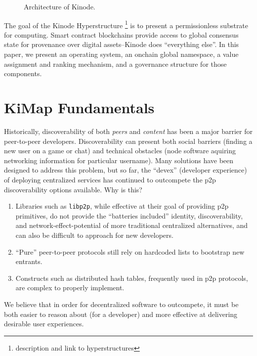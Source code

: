 \documentclass[runningheads]{llncs}
\begin{document}
\begin{figure}[H]
    \centering
    \caption{Architecture of Kinode.}
    \label{fig:triangle}
\end{figure}

The goal of the Kinode Hyperstructure
\footnote{description and link to hyperstructures}
is to present a permissionless substrate for computing.
Smart contract blockchains provide access to global consensus state for provenance over digital assets–Kinode does ``everything else''.
In this paper, we present an operating system, an onchain global namespace, a value assignment and ranking mechanism, and a governance structure for those components.

\section{KiMap Fundamentals}
\label{sec:kimap}

Historically, discoverability of both \textit{peers} and \textit{content} has been a major barrier for peer-to-peer developers.
Discoverability can present both social barriers (finding a new user on a game or chat) and technical obstacles (node software aquiring networking information for particular username).
Many solutions have been designed to address this problem, but so far, the ``devex'' (developer experience) of deploying centralized services has continued to outcompete the p2p discoverability options available.
Why is this?
\begin{enumerate}
    \item Libraries such as \verb|libp2p|, while effective at their goal of providing p2p primitives, do not provide the ``batteries included'' identity, discoverability, and network-effect-potential of more traditional centralized alternatives, and can also be difficult to approach for new developers.
    \item ``Pure'' peer-to-peer protocols still rely on hardcoded lists to bootstrap new entrants.
    \item Constructs such as distributed hash tables, frequently used in p2p protocols, are complex to properly implement.
\end{enumerate}
We believe that in order for decentralized software to outcompete, it must be both easier to reason about (for a developer) and more effective at delivering desirable user experiences.
\end{document}
